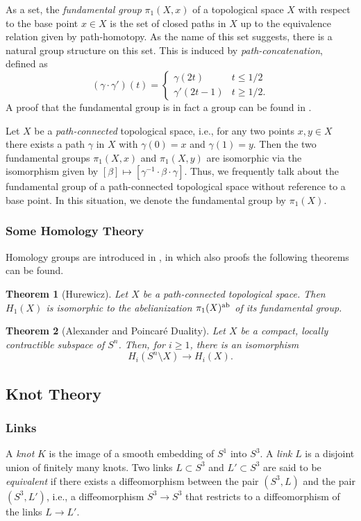 \documentclass[a4paper]{article}
\newtheorem{theorem}{Theorem}[section]
\theoremstyle{definition}
\begin{document}
As a set, the \textit{fundamental group} $\pi_1(X, x)$ of a topological space $X$ with respect to the base point $x \in X$ is the set of closed paths in $X$ up to the equivalence relation given by path-homotopy. As the name of this set suggests, there is a natural group structure on this set. This is induced by \textit{path-concatenation}, defined as
$$(\gamma \cdot \gamma') (t) = \begin{cases}
\gamma(2t) & t \leq 1/2 \\
\gamma'(2t - 1)	& t \geq 1/2.
\end{cases}$$
A proof that the fundamental group is in fact a group can be found in \cite{hatcher2002}.

Let $X$ be a \textit{path-connected} topological space, i.e., for any two points $x, y \in X$ there exists a path $\gamma$ in $X$ with $\gamma(0) = x$ and $\gamma(1) = y$. Then the two fundamental groups $\pi_1(X, x)$ and $\pi_1(X, y)$ are isomorphic via the isomorphism given by $[\beta] \mapsto [\gamma^{-1} \cdot \beta \cdot \gamma]$. Thus, we frequently talk about the fundamental group of a path-connected topological space without reference to a base point. In this situation, we denote the fundamental group by $\pi_1(X)$.

\subsubsection{Some Homology Theory}
Homology groups are introduced in \cite{hatcher2002}, in which also proofs the following theorems can be found.

\begin{theorem}[Hurewicz]
Let $X$ be a path-connected topological space. Then $H_1(X)$ is isomorphic to the abelianization $\pi_1(X)^{\textup{ab}}$ of its fundamental group.
\end{theorem}

\begin{theorem}[Alexander and Poincar\'e Duality]
Let $X$ be a compact, locally contractible subspace of $S^n$. Then, for $i \geq 1$, there is an isomorphism $$H_i(S^n \setminus X) \rightarrow H_i(X).$$
\end{theorem}
\subsection{Knot Theory}
\subsubsection{Links}
A \textit{knot} $K$ is the image of a smooth embedding of $S^1$ into $S^3$. A \textit{link} $L$ is a disjoint union of finitely many knots. Two links $L \subset S^3$ and $L' \subset S^3$ are said to be \textit{equivalent} if there exists a diffeomorphism between the pair $(S^3, L)$ and the pair $(S^3, L')$, i.e., a diffeomorphism $S^3 \rightarrow S^3$ that restricts to a diffeomorphism of the links $L \rightarrow L'$.
\end{document}
